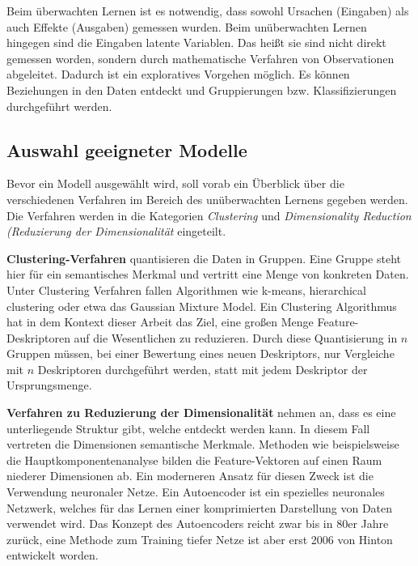 Beim überwachten Lernen ist es notwendig, dass sowohl Ursachen (Eingaben) als auch Effekte (Ausgaben) gemessen wurden. Beim unüberwachten Lernen hingegen sind die Eingaben latente Variablen. Das heißt sie sind nicht direkt gemessen worden, sondern durch mathematische Verfahren von Observationen abgeleitet. Dadurch ist ein exploratives Vorgehen möglich. Es können Beziehungen in den Daten entdeckt und Gruppierungen bzw. Klassifizierungen durchgeführt werden.

\subsection{Auswahl geeigneter Modelle}

Bevor ein Modell ausgewählt wird, soll vorab ein Überblick über die verschiedenen Verfahren im Bereich des unüberwachten Lernens gegeben werden. Die Verfahren werden in die Kategorien \textit{Clustering} und \textit{Dimensionality Reduction (Reduzierung der Dimensionalität} eingeteilt. 

\textbf{Clustering-Verfahren} quantisieren die Daten in Gruppen. Eine Gruppe steht hier für ein semantisches Merkmal und vertritt eine Menge von konkreten Daten. Unter Clustering Verfahren fallen Algorithmen wie k-means, hierarchical clustering oder etwa das Gaussian Mixture Model. Ein Clustering Algorithmus hat in dem Kontext dieser Arbeit das Ziel, eine großen Menge Feature-Deskriptoren auf die Wesentlichen zu reduzieren. Durch diese Quantisierung in $n$ Gruppen müssen, bei einer Bewertung eines neuen Deskriptors, nur Vergleiche mit $n$ Deskriptoren durchgeführt werden, statt mit jedem Deskriptor der Ursprungsmenge.\newline

\textbf{Verfahren zu Reduzierung der Dimensionalität} nehmen an, dass es eine unterliegende Struktur gibt, welche entdeckt werden kann. In diesem Fall vertreten die Dimensionen semantische Merkmale. Methoden wie beispielsweise die Hauptkomponentenanalyse bilden die Feature-Vektoren auf einen Raum niederer Dimensionen ab.  Ein moderneren Ansatz für diesen Zweck ist die Verwendung neuronaler Netze. Ein Autoencoder ist ein spezielles neuronales Netzwerk, welches für das Lernen einer komprimierten Darstellung von Daten verwendet wird. Das Konzept des Autoencoders reicht zwar bis in 80er Jahre zurück, eine Methode zum Training tiefer Netze ist aber erst 2006 von Hinton entwickelt worden.\newline

